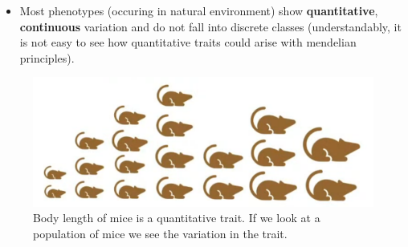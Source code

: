 \documentclass[11pt,ignorenonframetext,aspectratio=169]{beamer}
\providecommand{\tightlist}{%
  \setlength{\itemsep}{0pt}\setlength{\parskip}{0pt}}
\begin{document}
\begin{frame}{}
\protect\hypertarget{section-1}{}
\begin{itemize}
\tightlist
\item
  Most phenotypes (occuring in natural environment) show
  \textbf{quantitative}, \textbf{continuous} variation and do not fall
  into discrete classes (understandably, it is not easy to see how
  quantitative traits could arise with mendelian principles).
\end{itemize}

\begin{figure}
\includegraphics[width=0.65\linewidth]{./images/quantitative_variation} \caption{Body length of mice is a quantitative trait. If we look at a population of mice we see the variation in the trait.}\label{fig:quantitative-variation-mice-size}
\end{figure}
\end{frame}
\end{document}
